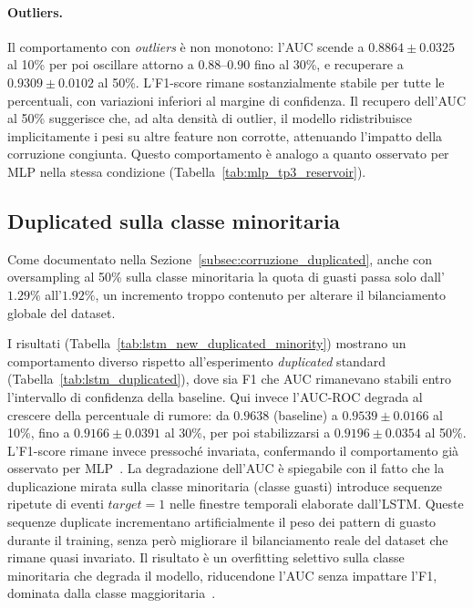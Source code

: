 \documentclass[../main.tex]{subfiles}
\begin{document}
\paragraph{Outliers.}
Il comportamento con \textit{outliers} è non monotono: l'AUC scende a $0.8864 \pm 0.0325$ al 10\% per poi oscillare attorno a $0.88$--$0.90$ fino al 30\%, e recuperare a $0.9309 \pm 0.0102$ al 50\%. L'F1-score rimane sostanzialmente stabile per tutte le percentuali, con variazioni inferiori al margine di confidenza. Il recupero dell'AUC al 50\% suggerisce che, ad alta densità di outlier, il modello ridistribuisce implicitamente i pesi su altre feature non corrotte, attenuando l'impatto della corruzione congiunta. Questo comportamento è analogo a quanto osservato per MLP nella stessa condizione (Tabella~\ref{tab:mlp_tp3_reservoir}).

\subsection{Duplicated sulla classe minoritaria}
\label{subsec:lstm_duplicated_minority}

Come documentato nella Sezione~\ref{subsec:corruzione_duplicated}, anche con oversampling al 50\% sulla classe minoritaria la quota di guasti passa solo dall'$1.29\%$ all'$1.92\%$, un incremento troppo contenuto per alterare il bilanciamento globale del dataset.

I risultati (Tabella~\ref{tab:lstm_new_duplicated_minority}) mostrano un comportamento diverso rispetto all'esperimento \textit{duplicated} standard (Tabella~\ref{tab:lstm_duplicated}), dove sia F1 che AUC rimanevano stabili entro l'intervallo di confidenza della baseline. Qui invece l'AUC-ROC degrada al crescere della percentuale di rumore: da $0.9638$ (baseline) a $0.9539 \pm 0.0166$ al 10\%, fino a $0.9166 \pm 0.0391$ al 30\%, per poi stabilizzarsi a $0.9196 \pm 0.0354$ al 50\%. L'F1-score rimane invece pressoché invariata, confermando il comportamento già osservato per MLP~\cite{buda2018systematic}.
La degradazione dell'AUC è spiegabile con il fatto che la duplicazione mirata sulla classe minoritaria (classe guasti) introduce sequenze ripetute di eventi $target = 1$ nelle finestre temporali elaborate dall'LSTM. Queste sequenze duplicate incrementano artificialmente il peso dei pattern di guasto durante il training, senza però migliorare il bilanciamento reale del dataset che rimane quasi invariato. Il risultato è un overfitting selettivo sulla classe minoritaria che degrada il modello, riducendone l'AUC senza impattare l'F1, dominata dalla classe maggioritaria~\cite{johnson2019survey}.
\end{document}
